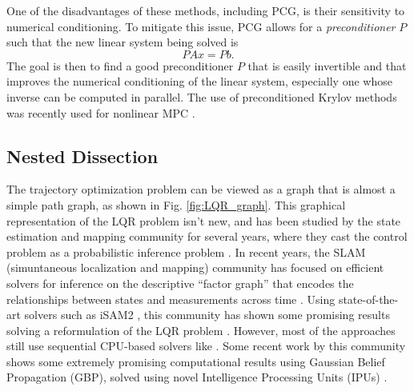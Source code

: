 \documentclass[../root.tex]{subfiles}
\begin{document}
One of the disadvantages of these methods, including PCG, is their 
sensitivity to numerical conditioning. To mitigate this issue, PCG 
allows for a \textit{preconditioner} $P$ such that the new linear system
being solved is 
\begin{equation}
    PAx = Pb.
\end{equation}
The goal is then to find a good preconditioner $P$ that is easily invertible
and that improves the numerical conditioning of the linear system, 
especially one whose inverse can be computed in parallel. The use of preconditioned
Krylov methods was recently used for nonlinear MPC \cite{knyazev_Sparse_2016}. 

\subsection{Nested Dissection}
The trajectory optimization problem can be viewed as a graph that is almost
a simple path graph, as shown in Fig. \ref{fig:LQR_graph}. This graphical 
representation of the LQR problem isn't new, and has been studied by the 
state estimation and mapping community for several years, where they cast the 
control problem as a probabilistic inference problem \cite{toussaint_Robot_2009a}.
In recent years, the SLAM (simuntaneous localization and mapping) community has 
focused on efficient solvers for inference on the descriptive ``factor graph'' that
encodes the relationships between states and measurements across time 
\cite{dellaert_Factor_2017,kaess_iSAM2_2012}. Using state-of-the-art solvers such as
iSAM2 \cite{kaess_iSAM_2008,kaess_iSAM2_2012}, this community has shown some promising
results solving a reformulation of the LQR problem 
\cite{yang_Equality_2020,dong_Motion_2016,mukadam_Gaussian_2016}. However, most of the 
approaches still use sequential CPU-based solvers like \cite{kaess_iSAM2_2012}. 
Some recent work by this community shows some extremely promising computational results 
using Gaussian Belief Propagation (GBP), solved using novel Intelligence Processing Units 
(IPUs) \cite{davison_FutureMapping_2019,ortiz_Bundle_2020}.
\end{document}

